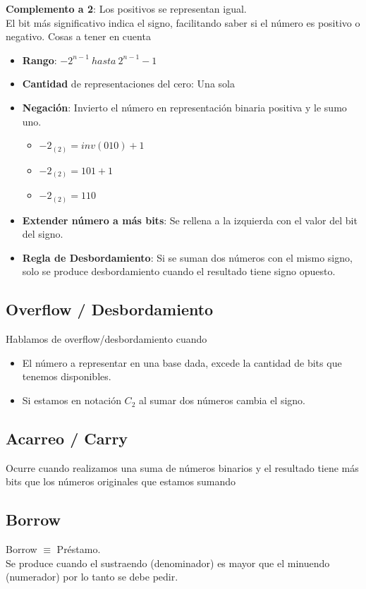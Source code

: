 \documentclass[10pt,a4paper]{article}
\begin{document}
\textbf{Complemento a 2}: Los positivos se representan igual. \\ 
El bit más significativo indica el signo, facilitando saber si el número es positivo o negativo.
Cosas a tener en cuenta
\begin{itemize}
    \item \textbf{Rango}: \( -2^{n-1} \ hasta \ 2^{n-1}-1 \)
    \item \textbf{Cantidad} de representaciones del cero: Una sola
    \item \textbf{Negación}: Invierto el número en representación binaria positiva y le sumo uno.
    \begin{itemize}
        \item \(-2_{(2)} = inv(010) + 1\)
        \item \(-2_{(2)} = 101 + 1\)
        \item \(-2_{(2)} = 110\)
    \end{itemize}
    \item \textbf{Extender número a más bits}: Se rellena a la izquierda con el valor del bit del signo.
    \item \textbf{Regla de Desbordamiento}: Si se suman dos números con el mismo signo, solo se produce desbordamiento cuando el resultado tiene signo opuesto.
\end{itemize}

\subsection*{Overflow / Desbordamiento}
Hablamos de overflow/desbordamiento cuando 
\begin{itemize}
    \item\label{item:overflow1} El número a representar en una base dada, excede la cantidad de bits que tenemos disponibles.
    \item\label{item:overflow2} Si estamos en notación \(C_{2}\) al sumar dos números cambia el signo.
\end{itemize} 


\subsection*{Acarreo / Carry}
Ocurre cuando realizamos una suma de números binarios y el resultado tiene más bits que los números originales que estamos sumando

\subsection*{Borrow}
Borrow \(\equiv\) Préstamo. \\
Se produce cuando el sustraendo (denominador) es mayor que el minuendo (numerador) por lo tanto se debe pedir.
\end{document}
